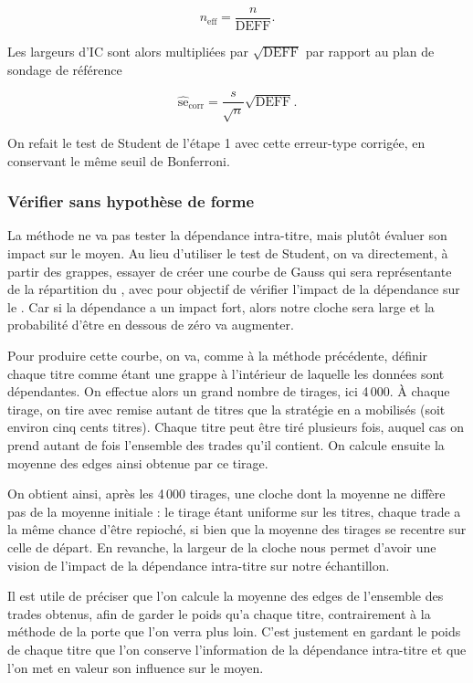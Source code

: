 \[
  n_{\mathrm{eff}} = \frac{n}{\mathrm{DEFF}} .
\]

Les largeurs d'IC sont alors multipliées par $\sqrt{\mathrm{DEFF}}$ par rapport au
plan de sondage de référence

\[
  \widehat{\mathrm{se}}_{\mathrm{corr}}
        = \frac{s}{\sqrt{n}}\sqrt{\mathrm{DEFF}} .
\]

On refait le test de Student de l'étape 1 avec cette erreur-type corrigée, en
conservant le même seuil de Bonferroni.

\subsubsection*{Vérifier sans hypothèse de forme}

La méthode ne va pas tester la dépendance intra-titre,
mais plutôt évaluer son impact sur le \edgevar{} moyen.
Au lieu d'utiliser le test de Student, on va directement, à partir des
grappes, essayer de créer une courbe de Gauss qui sera représentante de la
répartition du \edgevar{}, avec pour objectif de vérifier l'impact de la dépendance
sur le \edgevar{}. Car si la dépendance a un impact fort, alors notre cloche sera
large et la probabilité d'être en dessous de zéro va augmenter.

Pour produire cette courbe, on va, comme à la méthode précédente, définir
chaque titre comme étant une grappe à l'intérieur de laquelle les données
sont dépendantes. On effectue alors un grand nombre de tirages, ici 4\,000.
À chaque tirage, on tire avec remise autant de titres que la stratégie en a
mobilisés (soit environ cinq cents titres). Chaque titre peut être tiré
plusieurs fois, auquel cas on prend autant de fois l'ensemble des trades
qu'il contient. On calcule ensuite la moyenne des edges ainsi obtenue par
ce tirage.

On obtient ainsi, après les 4\,000 tirages, une cloche dont la moyenne ne
diffère pas de la moyenne initiale : le tirage étant uniforme sur les titres,
chaque trade a la même chance d'être repioché, si bien que la moyenne des
tirages se recentre sur celle de départ. En revanche, la largeur de la cloche
nous permet d'avoir une vision de l'impact de la dépendance intra-titre sur
notre échantillon.

Il est utile de préciser que l'on calcule la moyenne des edges de l'ensemble
des trades obtenus, afin de garder le poids qu'a chaque titre, contrairement
à la méthode de la porte que l'on verra plus loin. C'est justement en
gardant le poids de chaque titre que l'on conserve l'information de la
dépendance intra-titre et que l'on met en valeur son influence sur le \edgevar{}
moyen.

